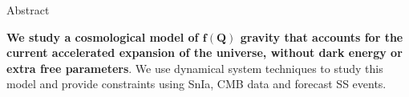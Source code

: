 \begin{block}{Abstract}

\textbf{We study a cosmological model of $\boldsymbol{f(Q)}$ gravity that accounts for the current accelerated expansion of the universe, without dark energy or extra free parameters}. We use dynamical system techniques to study this model and provide constraints using \gls{SnIa}, \gls{CMB} data and forecast \gls{SS} events.
  
\end{block}
